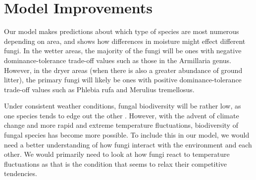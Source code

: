 \documentclass[12pt]{article}
\begin{document}

\section{Model Improvements}

Our model makes predictions about which type of species are most numerous depending on area, and shows how differences in moisture might effect different fungi. In the wetter areas, the majority of the fungi will be ones with negative dominance-tolerance trade-off values such as those in the Armillaria genus. However, in the dryer areas (when there is also a greater abundance of ground litter), the primary fungi will likely be ones with positive dominance-tolerance trade-off values such as Phlebia rufa and Merulius tremellosus. 

Under consistent weather conditions, fungal biodiversity will be rather low, as one species tends to edge out the other \cite{Toljander}. However, with the advent of climate change and more rapid and extreme temperature fluctuations, biodiversity of fungal species has become more possible. To include this in our model, we would need a better understanding of how fungi interact with the environment and each other. We would primarily need to look at how fungi react to temperature fluctuations as that is the condition that seems to relax their competitive tendencies. 
\end{document}
